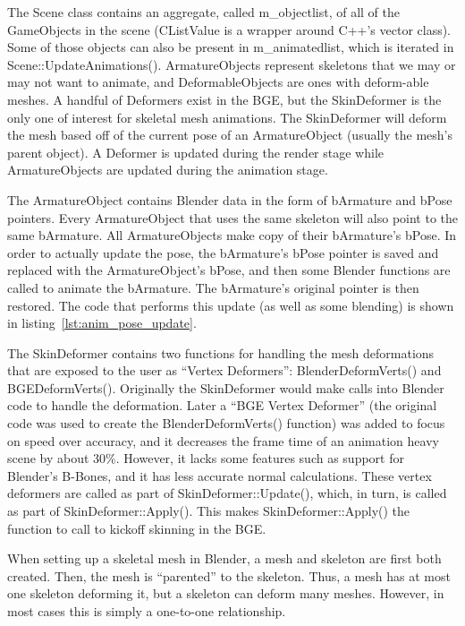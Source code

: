 
The Scene class contains an aggregate, called m\_objectlist, of all of the GameObjects in the scene (CListValue is a wrapper around C++'s vector class).
Some of those objects can also be present in m\_animatedlist, which is iterated in Scene::UpdateAnimations().
ArmatureObjects represent skeletons that we may or may not want to animate, and DeformableObjects are ones with deform-able meshes.
A handful of Deformers exist in the BGE, but the SkinDeformer is the only one of interest for skeletal mesh animations.
The SkinDeformer will deform the mesh based off of the current pose of an ArmatureObject (usually the mesh's parent object).
A Deformer is updated during the render stage while ArmatureObjects are updated during the animation stage.

The ArmatureObject contains Blender data in the form of bArmature and bPose pointers.
Every ArmatureObject that uses the same skeleton will also point to the same bArmature.
All ArmatureObjects make copy of their bArmature's bPose.
In order to actually update the pose, the bArmature's bPose pointer is saved and replaced with the ArmatureObject's bPose, and then some Blender functions are called to animate the bArmature.
The bArmature's original pointer is then restored.
The code that performs this update (as well as some blending) is shown in listing~\ref{lst:anim_pose_update}.


The SkinDeformer contains two functions for handling the mesh deformations that are exposed to the user as ``Vertex Deformers'': BlenderDeformVerts() and BGEDeformVerts().
Originally the SkinDeformer would make calls into Blender code to handle the deformation.
Later a ``BGE Vertex Deformer'' (the original code was used to create the BlenderDeformVerts() function) was added to focus on speed over accuracy, and it decreases the frame time of an animation heavy scene by about 30\%.
However, it lacks some features such as support for Blender's B-Bones, and it has less accurate normal calculations.
These vertex deformers are called as part of SkinDeformer::Update(), which, in turn, is called as part of SkinDeformer::Apply().
This makes SkinDeformer::Apply() the function to call to kickoff skinning in the BGE.

When setting up a skeletal mesh in Blender, a mesh and skeleton are first both created.
Then, the mesh is ``parented'' to the skeleton.
Thus, a mesh has at most one skeleton deforming it, but a skeleton can deform many meshes.
However, in most cases this is simply a one-to-one relationship.

